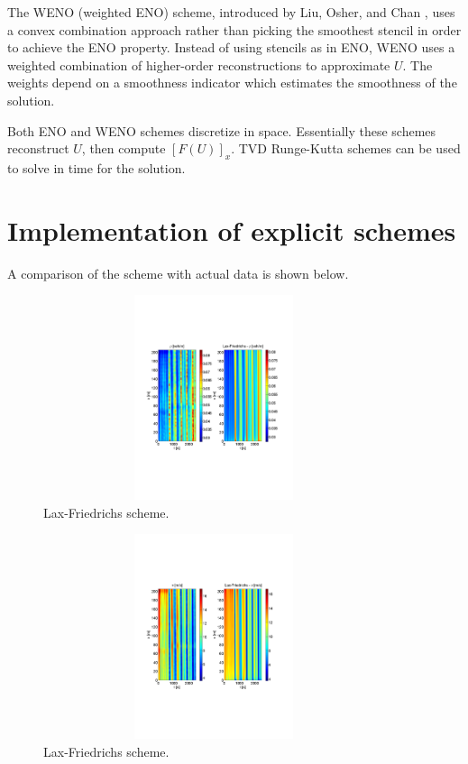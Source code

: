 \documentclass[letterpaper]{article}
\begin{document}
The WENO (weighted ENO) scheme, introduced by Liu, Osher, and Chan \cite{WENO}, uses a convex combination approach rather than picking the smoothest stencil in order to achieve the ENO property. Instead of using stencils as in ENO, WENO uses a weighted combination of higher-order reconstructions to approximate $U$. The weights depend on a smoothness indicator which estimates the smoothness of the solution. 

Both ENO and WENO schemes discretize in space. Essentially these schemes reconstruct $U$, then compute $[F(U)]_x$. TVD Runge-Kutta schemes can be used to solve in time for the solution. 

\section{Implementation of explicit schemes}
A comparison of the scheme with actual data is shown below. 

\begin{figure}[H]
\centering
\includegraphics[trim = 20mm 75mm 20mm 75mm, width = 100mm, height = 60mm]{LFrho.pdf}
\caption{Lax-Friedrichs scheme.}
\label{fig:LFrho}
\end{figure}

\begin{figure}[H]
\centering
\includegraphics[trim = 20mm 75mm 20mm 75mm, width = 100mm, height = 60mm]{LFv.pdf}
\caption{Lax-Friedrichs scheme.}
\label{fig:LFv}
\end{figure}
\end{document}

